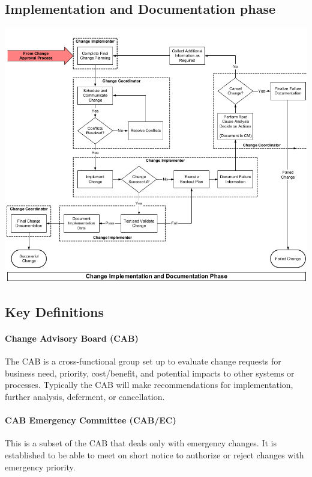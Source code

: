 \documentclass[8pt]{extarticle}
\begin{document}
\begin{multicols}{3}
\subsection{Implementation and Documentation phase}
\begin{center}
    \begin{minipage}{\columnwidth}
        \includegraphics[width=\columnwidth]{change-implementation-documentation-phase.png}
    \end{minipage}
\end{center}

\subsection{Key Definitions}
    \paragraph{Change Advisory Board (CAB)} The CAB is a cross-functional group set up to evaluate change requests
    for business need, priority, cost/benefit, and potential impacts to other systems or processes. Typically
    the CAB will make recommendations for implementation, further analysis, deferment, or cancellation.
    \paragraph{CAB Emergency Committee (CAB/EC)} This is a subset of the CAB that deals only with emergency
    changes. It is established to be able to meet on short notice to authorize or reject changes with
    emergency priority.

\end{multicols}
\end{document}
